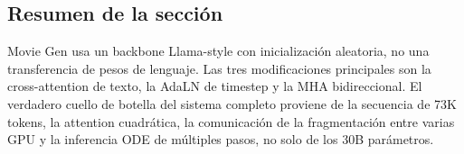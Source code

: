 
\subsection{Resumen de la sección}

Movie Gen usa un backbone Llama-style con inicialización aleatoria, no una transferencia de pesos de lenguaje. Las tres modificaciones principales son la cross-attention de texto, la AdaLN de timestep y la MHA bidireccional. El verdadero cuello de botella del sistema completo proviene de la secuencia de 73K tokens, la attention cuadrática, la comunicación de la fragmentación entre varias GPU y la inferencia ODE de múltiples pasos, no solo de los 30B parámetros.

